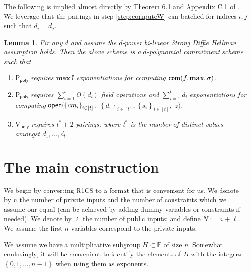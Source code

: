 \documentclass[11pt]{article}
\numberwithin{figure}{section} %
\newtheorem{lemma}[thm]{Lemma}
\renewcommand{\max}{\ensuremath{\mathrm{\mathbf{max}}}\xspace}
\newcommand{\set}[1]{\ensuremath{\left\{#1\right\}}\xspace}
\newcommand{\F}{\ensuremath{\mathbb F}\xspace}
\newcommand{\defeq}{:=}
\newcommand{\sett}[2]{\ensuremath{\set{#1}_{#2}}\xspace}
\newcommand{\prvpoly}{\ensuremath{\mathrm{P_{\mathsf{poly}}}}\xspace}
\newcommand{\verpoly}{\ensuremath{\mathrm{V_{\mathsf{poly}}}}\xspace}
\begin{document}
The following is implied almost directly by Theorem 6.1 and Appendix C.1 of  \cite{sonic}. We leverage that the pairings in step \ref{step:computeW} can batched for indices $i,j$ such that $d_i=d_j$.
\begin{lemma}\label{lem:pcSCHEME}
Fix any $d$ and assume the $d$-power bi-linear Strong Diffie Hellman assumption holds.
 Then the above scheme is a $d$-polynomial commitment scheme such that
 \begin{enumerate}
  \item \prvpoly requires \max \G1 exponentiations for computing $\com(f,\max,\srs)$.
  \item \prvpoly requires $\sum_{i=1}^t O(d_i)$ field operations and  $\sum_{i=1}^t d_i$ exponentiations for computing $\open(\sett{cm_i}{i\in [t]},$ $\sett{d_i}{i\in [t]},\sett{s_i}{i\in [t]},$ $z)$.
\item \verpoly requires $t^*+2$ pairings, where $t^*$ is the number of distinct values amongst $d_1,\ldots,d_t$.
  \end{enumerate}

\end{lemma}


\section{The main construction}\label{sec:main}
We begin by converting R1CS to a format that is convenient for us.
We denote by $n$ the number of private inputs and the number of constraints which we assume our equal (can be achieved by adding dummy variables or constraints if needed).
We denote by $\ell$ the number of public inputs; and define $N\defeq n+\ell$.
We assume the first $n$ variables correspond to the private inputs.

We assume we have a multiplicative subgroup $H\subset \F$ of size $n$.
Somewhat confusingly, it will be convenient to identify the elements of $H$ with the integers $\set{0,1,\ldots,n-1}$ when using them as exponents.
\end{document}
